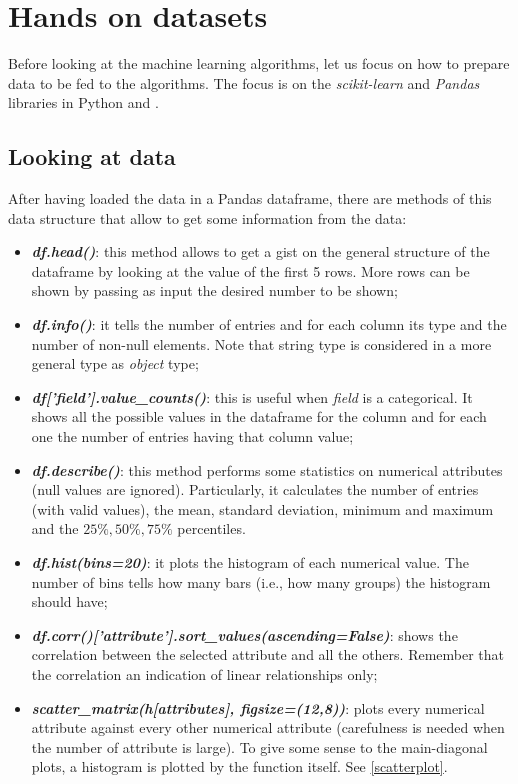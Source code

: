 \section{Hands on datasets}
Before looking at the machine learning algorithms, let us focus on how to prepare data to be fed to the algorithms. The focus is on the \textit{scikit-learn} and \textit{Pandas} libraries in Python and .

\subsection{Looking at data}
After having loaded the data in a Pandas dataframe, there are methods of this data structure that allow to get some information from the data:
\begin{itemize}
\item \textbf{\textit{df.head()}}: this method allows to get a gist on the general structure of the dataframe by looking at the value of the first 5 rows. More rows can be shown by passing as input the desired number to be shown;

\item \textbf{\textit{df.info()}}: it tells the number of entries and for each column its type and the number of non-null elements. Note that string type is considered in a more general type as \textit{object} type;
\item \textbf{\textit{df['field'].value\_counts()}}: this is useful when \textit{field} is a categorical. It shows all the possible values in the dataframe for the column and for each one the number of entries having that column value;
\item \textbf{\textit{df.describe()}}: this method performs some statistics on numerical attributes (null values are ignored). Particularly, it calculates the number of entries (with valid values), the mean, standard deviation, minimum and maximum and the $25\%, 50\%, 75\%$ percentiles.
\item\textbf{\textit{df.hist(bins=20)}}: it plots the histogram of each numerical value. The number of bins tells how many bars (i.e., how many groups) the histogram should have;
\item\textbf{\textit{df.corr()['attribute'].sort\_values(ascending=False)}}: shows the correlation between the selected attribute and all the others. Remember that the correlation an indication of linear relationships only;
\item\textbf{\textit{scatter\_matrix(h[attributes], figsize=(12,8))}}: plots every numerical attribute against every other numerical attribute (carefulness is needed when the number of attribute is large). To give some sense to the main-diagonal plots, a histogram is plotted by the function itself. See \autoref{scatterplot}.
\end{itemize}

